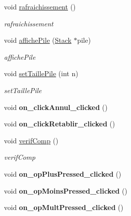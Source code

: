 \begin{DoxyCompactItemize}
\item 
void \hyperlink{class_main_window_a4ac7bad46ea08893e2d1b05aba856313}{rafraichissement} ()
\begin{DoxyCompactList}\small\item\em rafraichissement \end{DoxyCompactList}\item 
void \hyperlink{class_main_window_a383d0972b63fd6bc32492a7ea28d7c29}{affiche\-Pile} (\hyperlink{class_stack}{Stack} $\ast$pile)
\begin{DoxyCompactList}\small\item\em affiche\-Pile \end{DoxyCompactList}\item 
void \hyperlink{class_main_window_a8ad4c5351c9476683ec0af062a4a8db6}{set\-Taille\-Pile} (int n)
\begin{DoxyCompactList}\small\item\em set\-Taille\-Pile \end{DoxyCompactList}\item 
\hypertarget{class_main_window_a63c66c61424a0458307d5c65bf4a662c}{void {\bfseries on\-\_\-click\-Annul\-\_\-clicked} ()}\label{class_main_window_a63c66c61424a0458307d5c65bf4a662c}

\item 
\hypertarget{class_main_window_af16361cab06aa0b810a4ff2cf3ea4ebf}{void {\bfseries on\-\_\-click\-Retablir\-\_\-clicked} ()}\label{class_main_window_af16361cab06aa0b810a4ff2cf3ea4ebf}

\item 
void \hyperlink{class_main_window_aa7418ed9e02055f4f8139a00a97bec6a}{verif\-Comp} ()
\begin{DoxyCompactList}\small\item\em verif\-Comp \end{DoxyCompactList}\item 
\hypertarget{class_main_window_a4a72f18de14174e0acc0c264b14458de}{void {\bfseries on\-\_\-op\-Plus\-Pressed\-\_\-clicked} ()}\label{class_main_window_a4a72f18de14174e0acc0c264b14458de}

\item 
\hypertarget{class_main_window_a99d1e5ca72ca93a5bf422c15f6e6393d}{void {\bfseries on\-\_\-op\-Moins\-Pressed\-\_\-clicked} ()}\label{class_main_window_a99d1e5ca72ca93a5bf422c15f6e6393d}

\item 
\hypertarget{class_main_window_a1b25a2b9c090eff2d2c05addabeccd18}{void {\bfseries on\-\_\-op\-Mult\-Pressed\-\_\-clicked} ()}\label{class_main_window_a1b25a2b9c090eff2d2c05addabeccd18}


\end{DoxyCompactItemize}
